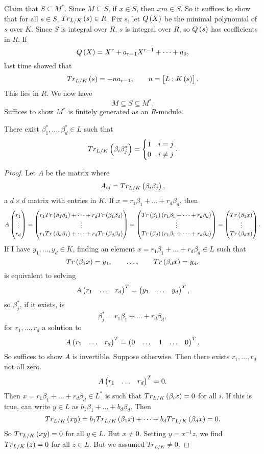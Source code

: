 \pagebreak

Claim that $ S \subseteq M^* $. Since $ M \subseteq S $, if $ x \in S $, then $ xm \in S $. So it suffices to show that for all $ s \in S $, $ Tr_{L / K}\br{s} \in R $. Fix $ s $, let $ Q\br{X} $ be the minimal polynomial of $ s $ over $ K $. Since $ S $ is integral over $ R $, $ s $ is integral over $ R $, so $ Q\br{s} $ has coefficients in $ R $. If
$$ Q\br{X} = X^r + a_{r - 1}X^{r - 1} + \dots + a_0, $$
last time showed that
$$ Tr_{L / K}\br{s} = -na_{r - 1}, \qquad n = \sbr{L : K\br{s}}. $$
This lies in $ R $. We now have
$$ M \subseteq S \subseteq M^*. $$
Suffices to show $ M^* $ is finitely generated as an $ R $-module.

\begin{proposition}
There exist $ \beta_1^*, \dots, \beta_d^* \in L $ such that
$$ Tr_{L / K}\br{\beta_i\beta_j^*} =
\begin{cases}
1 & i = j \\
0 & i \ne j
\end{cases}.
$$
\end{proposition}

\begin{proof}
Let $ A $ be the matrix where
$$ A_{ij} = Tr_{L / K}\br{\beta_i\beta_j}, $$
a $ d \times d $ matrix with entries in $ K $. If $ x = r_1\beta_1 + \dots + r_d\beta_d $, then
$$ A\threebyone{r_1}{\vdots}{r_d} = \threebyone{r_1Tr\br{\beta_1\beta_1} + \dots + r_dTr\br{\beta_1\beta_d}}{\vdots}{r_1Tr\br{\beta_d\beta_1} + \dots + r_dTr\br{\beta_d\beta_d}} = \threebyone{Tr\br{\beta_1}\br{r_1\beta_1 + \dots + r_d\beta_d}}{\vdots}{Tr\br{\beta_d}\br{r_1\beta_1 + \dots + r_d\beta_d}} = \threebyone{Tr\br{\beta_1x}}{\vdots}{Tr\br{\beta_dx}}. $$
If I have $ y_1, \dots, y_d \in K $, finding an element $ x = r_1\beta_1 + \dots + r_d\beta_d \in L $ such that
$$ Tr\br{\beta_1x} = y_1, \qquad \dots, \qquad Tr\br{\beta_dx} = y_d, $$
is equivalent to solving
$$ A\onebythree{r_1}{\dots}{r_d}^T = \onebythree{y_1}{\dots}{y_d}^T, $$
so $ \beta_j^* $, if it exists, is
$$ \beta_j^* = r_1\beta_1 + \dots + r_d\beta_d, $$
for $ r_1, \dots, r_d $ a solution to
$$ A\onebythree{r_1}{\dots}{r_d}^T = \onebythree{0}{\dots & 1 & \dots}{0}^T. $$
So suffices to show $ A $ is invertible. Suppose otherwise. Then there exists $ r_1, \dots, r_d $ not all zero.
$$ A\onebythree{r_1}{\dots}{r_d}^T = 0. $$
Then $ x = r_1\beta_1 + \dots + r_d\beta_d \in L^* $ is such that $ Tr_{L / K}\br{\beta_ix} = 0 $ for all $ i $. If this is true, can write $ y \in L $ as $ b_1\beta_1 + \dots + b_d\beta_d $. Then
$$ Tr_{L / K}\br{xy} = b_1Tr_{L / K}\br{\beta_1x} + \dots + b_dTr_{L / K}\br{\beta_dx} = 0. $$
So $ Tr_{L / K}\br{xy} = 0 $ for all $ y \in L $. But $ x \ne 0 $. Setting $ y = x^{-1}z $, we find $ Tr_{L / K}\br{z} = 0 $ for all $ z \in L $. But we assumed $ Tr_{L / K} \ne 0 $.
\end{proof}

